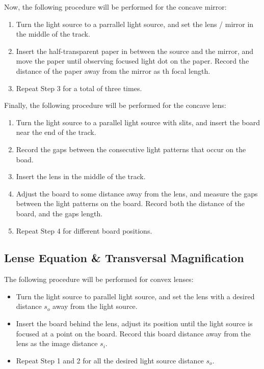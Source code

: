 \documentclass{article}
\begin{document}
\hfil

Now, the following procedure will be performed for the concave mirror:
\begin{enumerate}
    \item Turn the light source to a parrallel light source, and set the lens / mirror in the middle of the track.
    \item Insert the half-transparent paper in between the source and the mirror, and move the paper until observing focused light dot on the paper. Record the distance of the paper away from the mirror as th focal length.
    \item Repeat Step 3 for a total of three times.
\end{enumerate}

\hfil

Finally, the following procedure will be performed for the concave lens:
\begin{enumerate}
    \item Turn the light source to a parallel light source with slits, and insert the board near the end of the track.
    \item Record the gaps between the consecutive light patterns that occur on the boad.
    \item Insert the lens in the middle of the track.
    \item Adjust the board to some distance away from the lens, and measure the gaps between the light patterns on the board. Record both the distance of the board, and the gaps length.
    \item Repeat Step 4 for different board positions.
\end{enumerate}

\hfil

\subsection{Lense Equation \& Transversal Magnification}
The following procedure will be performed for convex lenses:
\begin{itemize}
    \item Turn the light source to parallel light source, and set the lens with a desired distance $s_o$ away from the light source.
    \item Insert the board behind the lens, adjust its position until the light source is focused at a point on the board. Record this board distance away from the lens as the image distance $s_i$.
    \item Repeat Step 1 and 2 for all the desired light source distance $s_o$.
\end{itemize}
\end{document}
